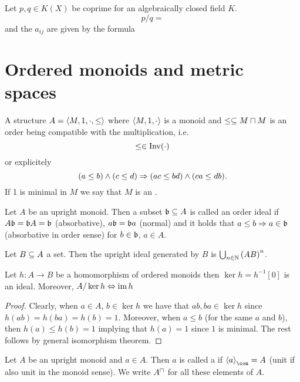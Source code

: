 \documentclass[8pt,a4paper]{article}
\begin{document}
\begin{lemma}
    Let $p,q\in K(X)$ be coprime for an algebraically closed field $K$.
    $$
    p/q=
    $$
    and the $a_{ij}$ are given by the formula
\end{lemma}

\section{Ordered monoids and metric spaces}

\begin{definition}
    A structure $A=\struct{M,1,\cdot,\leq}$ where $\struct{M,1,\cdot}$ is a monoid and $\leq\setleq M\setprod M$ is an order being compatible with the multiplication, i.e.
    $$
    \leq \in \mathop\mathrm{Inv}(\cdot)
    $$
    or explicitely
    $$
    (a\leq b) \wedge (c\leq d) \Rightarrow (ac\leq bd)\wedge (ca\leq db).
    $$
    If 1 is minimal in $M$ we say that $M$ is an .
\end{definition}

\begin{definition}
    Let $A$ be an upright monoid. Then a subset $\mathfrak{b}\subseteq A$ is called an order ideal if $A\mathfrak{b}=\mathfrak{b} A=\mathfrak{b}$ (absorbative), $a\mathfrak{b}=\mathfrak{b} a$ (normal) and it holds that $a\leq b \Rightarrow a\in \mathfrak{b}$ (absorbative in order sense) for $b\in \mathfrak{b}$, $a\in A$.
\end{definition}

\begin{lemma}
    Let $B\subseteq A$ a set. Then the upright ideal generated by $B$ is $\bigcup_{n\in\mathbb{N}}{{(AB)}^n}$.
\end{lemma}

\begin{lemma}
    Let $h:A\to B$ be a homomorphism of ordered monoids then
    $\ker{h}=h^{-1}[0]$ is an ideal. Moreover, $A/\ker{h}\Leftrightarrow \mathop\mathrm{im}{h}$
\end{lemma}

\begin{proof}
    Clearly, when $a\in A$, $b\in\ker{h}$ we have that $ab,ba\in\ker{h}$ since $h(ab)=h(ba)=h(b)=1$. Moreover, when $a\leq b$ (for the same $a$ and $b$), then $h(a)\leq h(b)=1$ implying that $h(a)=1$ since $1$ is minimal. The rest follows by general isomorphism theorem.
\end{proof}

\begin{definition}
    Let $A$ be an upright monoid and $a\in A$. Then $a$ is called a  if $\gen[\con]{a}=A$ (unit if also unit in the monoid sense). We write $\units{A}$ for all these elements of $A$.
\end{definition}
\end{document}
